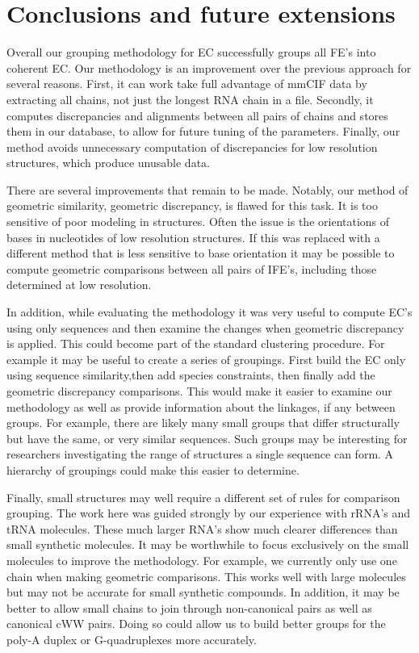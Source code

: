 \section{Conclusions and future extensions}

Overall our grouping methodology for EC successfully groups all FE's into
coherent EC. Our methodology is an improvement over the previous approach for
several reasons. First, it can work take full advantage of mmCIF data by
extracting all chains, not just the longest RNA chain in a file. Secondly, it
computes discrepancies and alignments between all pairs of chains and stores
them in our database, to allow for future tuning of the parameters. Finally, our
method avoids unnecessary computation of discrepancies for low resolution
structures, which produce unusable data. 

There are several improvements that remain to be made. Notably, our method of
geometric similarity, geometric discrepancy, is flawed for this task. It is too
sensitive of poor modeling in structures. Often the issue is the orientations of
bases in nucleotides of low resolution structures. If this was replaced with a
different method that is less sensitive to base orientation it may be possible
to compute geometric comparisons between all pairs of IFE's, including those
determined at low resolution.

In addition, while evaluating the methodology it was very useful to compute EC's
using only sequences and then examine the changes when geometric discrepancy is
applied. This could become part of the standard clustering procedure. For
example it may be useful to create a series of groupings. First build the EC
only using sequence similarity,then add species constraints, then finally add
the geometric discrepancy comparisons. This would make it easier to examine our
methodology as well as provide information about the linkages, if any between
groups. For example, there are likely many small groups that differ structurally
but have the same, or very similar sequences. Such groups may be interesting for
researchers investigating the range of structures a single sequence can form. A
hierarchy of groupings could make this easier to determine.

Finally, small structures may well require a different set of rules for
comparison grouping. The work here was guided strongly by our experience with
rRNA's and tRNA molecules. These much larger RNA's show much clearer differences
than small synthetic molecules. It may be worthwhile to focus exclusively on the
small molecules to improve the methodology. For example, we currently only use
one chain when making geometric comparisons. This works well with large
molecules but may not be accurate for small synthetic compounds. In addition, it
may be better to allow small chains to join through non-canonical pairs as well
as canonical cWW pairs. Doing so could allow us to build better groups for the
poly-A duplex or G-quadruplexes more accurately.
